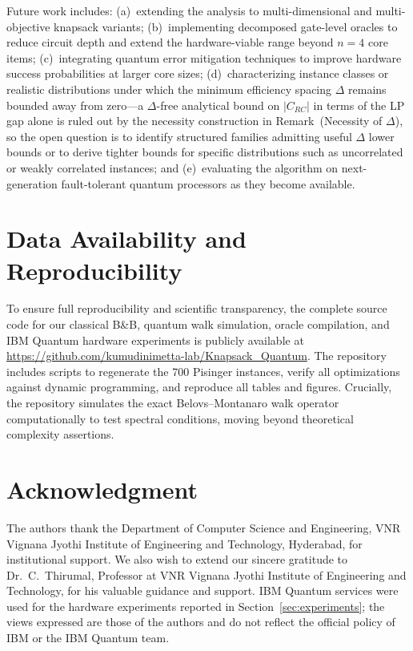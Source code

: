 \documentclass[conference]{IEEEtran}
\begin{document}
Future work includes: (a)~extending the analysis to multi-dimensional and multi-objective knapsack variants; (b)~implementing decomposed gate-level oracles to reduce circuit depth and extend the hardware-viable range beyond $n = 4$ core items; (c)~integrating quantum error mitigation techniques to improve hardware success probabilities at larger core sizes; (d)~characterizing instance classes or realistic distributions under which the minimum efficiency spacing $\Delta$ remains bounded away from zero---a $\Delta$-free analytical bound on $|C_{RC}|$ in terms of the LP gap alone is ruled out by the necessity construction in Remark~(Necessity of $\Delta$), so the open question is to identify structured families admitting useful $\Delta$ lower bounds or to derive tighter bounds for specific distributions such as uncorrelated or weakly correlated instances; and (e)~evaluating the algorithm on next-generation fault-tolerant quantum processors as they become available.




\section{Data Availability and Reproducibility}

To ensure full reproducibility and scientific transparency, the complete source code for our classical B\&B, quantum walk simulation, oracle compilation, and IBM Quantum hardware experiments is publicly available at \url{https://github.com/kumudinimetta-lab/Knapsack_Quantum}. The repository includes scripts to regenerate the 700 Pisinger instances, verify all optimizations against dynamic programming, and reproduce all tables and figures. Crucially, the repository simulates the exact Belovs--Montanaro walk operator computationally to test spectral conditions, moving beyond theoretical complexity assertions.










\section*{Acknowledgment}

The authors thank the Department of Computer Science and Engineering, VNR Vignana Jyothi Institute of Engineering and Technology, Hyderabad, for institutional support. We also wish to extend our sincere gratitude to Dr.~C.~Thirumal, Professor at VNR Vignana Jyothi Institute of Engineering and Technology, for his valuable guidance and support. IBM Quantum services were used for the hardware experiments reported in Section~\ref{sec:experiments}; the views expressed are those of the authors and do not reflect the official policy of IBM or the IBM Quantum team.



\end{document}
